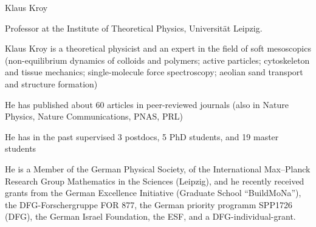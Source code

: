 \begin{participant}[type=R,PM=12,gender=male,salary=5500]{Klaus Kroy}

Professor at the Institute of Theoretical Physics, Universität Leipzig.

Klaus Kroy is a theoretical physicist and an expert in the field of
soft mesoscopics (non-equilibrium dynamics of colloids and polymers; active particles; cytoskeleton and tissue mechanics; single-molecule force spectroscopy; aeolian sand transport and structure formation)

He has published about 60 articles in peer-reviewed journals (also in
Nature Physics, Nature Communications, PNAS, PRL) 

He has in the past supervised 3 postdocs, 5 PhD students, and 19
master students 

He is a Member of the German Physical Society, of the International Max--Planck Research Group
Mathematics in the Sciences (Leipzig), and he recently received grants from
the German Excellence Initiative (Graduate School ``BuildMoNa''),
the DFG-Forschergruppe FOR 877, the German
priority programm SPP1726 (DFG), the German Israel
Foundation, the ESF, and a DFG-individual-grant.


\end{participant}
